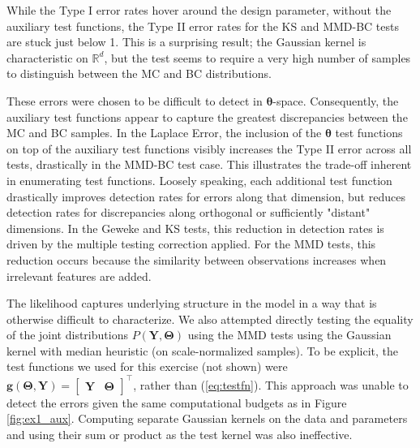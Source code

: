 \documentclass[a4paper,11pt]{article}
\begin{document}
While the Type I error rates hover around the design parameter, without the auxiliary test functions, the Type II error rates for the KS and MMD-BC tests are stuck just below 1. This is a surprising result; the Gaussian kernel is characteristic on $\mathbb{R}^{d}$, but the test seems to require a very high number of samples to distinguish between the MC and BC distributions.

These errors were chosen to be difficult to detect in $\mathbf{\theta}$-space. Consequently, the auxiliary test functions appear to capture the greatest discrepancies between the MC and BC samples. In the Laplace Error, the inclusion of the $\mathbf{\theta}$ test functions on top of the auxiliary test functions visibly increases the Type II error across all tests, drastically in the MMD-BC test case. This illustrates the trade-off inherent in enumerating test functions. Loosely speaking, each additional test function drastically improves detection rates for errors along that dimension, but reduces detection rates for discrepancies along orthogonal or sufficiently "distant" dimensions. In the Geweke and KS tests, this reduction in detection rates is driven by the multiple testing correction applied. For the MMD tests, this reduction occurs because the similarity between observations increases when irrelevant features are added.

The likelihood captures underlying structure in the model in a way that is otherwise difficult to characterize. We also attempted directly testing the equality of the joint distributions $P(\mathbf{Y}, \mathbf{\Theta})$ using the MMD tests using the Gaussian kernel with median heuristic (on scale-normalized samples). To be explicit, the test functions we used for this exercise (not shown) were $\mathbf{g}(\mathbf{\Theta}, \mathbf{Y}) = \begin{bmatrix}  \mathbf{Y}& \mathbf{\Theta} \end{bmatrix}^{\top}$, rather than (\ref{eq:testfn}). This approach was unable to detect the errors given the same computational budgets as in Figure \ref{fig:ex1_aux}. Computing separate Gaussian kernels on the data and parameters and using their sum or product as the test kernel was also ineffective.
\end{document}
